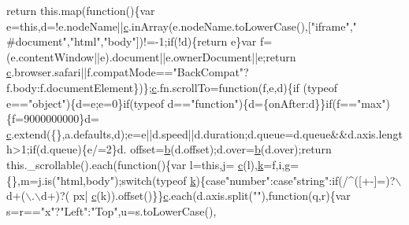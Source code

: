 \begin{DoxyCode}
{      return} this.map(\textcolor{keyword}{function}()\{var e=\textcolor{keyword}{this},d=!e.nodeName||\hyperlink{jquery_8js_ad171626e81625b5e9f5cb177a3a8fb1c}{c}.inArray(e.nodeName.toLowerCase(),[\textcolor{stringliteral}{"iframe"},\textcolor{stringliteral}{"
      #document"},\textcolor{stringliteral}{"html"},\textcolor{stringliteral}{"body"}])!=-1;\textcolor{keywordflow}{if}(!d)\{\textcolor{keywordflow}{return} e\}var f=(e.contentWindow||e).document||e.ownerDocument||e;\textcolor{keywordflow}{return} 
      \hyperlink{jquery_8js_ad171626e81625b5e9f5cb177a3a8fb1c}{c}.browser.safari||f.compatMode==\textcolor{stringliteral}{"BackCompat"}?f.body:f.documentElement\})\};\hyperlink{jquery_8js_ad171626e81625b5e9f5cb177a3a8fb1c}{c}.fn.scrollTo=\textcolor{keyword}{function}(f,e,d)\{\textcolor{keywordflow}{if}
      (typeof e==\textcolor{stringliteral}{"object"})\{d=e;e=0\}\textcolor{keywordflow}{if}(typeof d==\textcolor{stringliteral}{"function"})\{d=\{onAfter:d\}\}\textcolor{keywordflow}{if}(f==\textcolor{stringliteral}{"max"})\{f=9000000000\}d=
      \hyperlink{jquery_8js_ad171626e81625b5e9f5cb177a3a8fb1c}{c}.extend(\{\},a.defaults,d);e=e||d.speed||d.duration;d.queue=d.queue&&d.axis.length>1;\textcolor{keywordflow}{if}(d.queue)\{e/=2\}d.
      offset=\hyperlink{jquery_8js_aa4026ad5544b958e54ce5e106fa1c805}{b}(d.offset);d.over=\hyperlink{jquery_8js_aa4026ad5544b958e54ce5e106fa1c805}{b}(d.over);\textcolor{keywordflow}{return} this.\_scrollable().each(\textcolor{keyword}{function}()\{var l=\textcolor{keyword}{this},j=
      \hyperlink{jquery_8js_ad171626e81625b5e9f5cb177a3a8fb1c}{c}(l),\hyperlink{jquery_8js_ab26645c014aa005ecedef329ecf58c99}{k}=f,i,g=\{\},m=j.is(\textcolor{stringliteral}{"html,body"});\textcolor{keywordflow}{switch}(typeof \hyperlink{jquery_8js_ab26645c014aa005ecedef329ecf58c99}{k})\{\textcolor{keywordflow}{case}\textcolor{stringliteral}{"number"}:\textcolor{keywordflow}{case}\textcolor{stringliteral}{"string"}:\textcolor{keywordflow}{if}(/^([+-]=)?\(\backslash\)d+(\(\backslash\).\(\backslash\)d+)?(
      px|%
      \hyperlink{jquery_8js_ad171626e81625b5e9f5cb177a3a8fb1c}{c}(k)).offset()\}\}\hyperlink{jquery_8js_ad171626e81625b5e9f5cb177a3a8fb1c}{c}.each(d.axis.split(\textcolor{stringliteral}{""}),\textcolor{keyword}{function}(q,r)\{var s=r==\textcolor{stringliteral}{"x"}?\textcolor{stringliteral}{"Left"}:\textcolor{stringliteral}{"Top"},u=s.toLowerCase(),

\end{DoxyCode}
